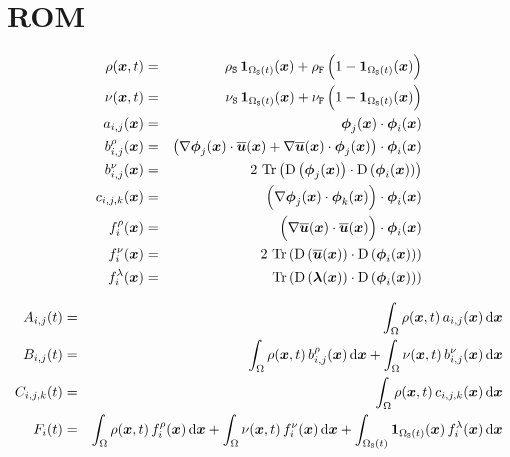 \documentclass[10pt,a4paper]{article}
\begin{document}
\section{ROM}
\begin{eqnarray}
\rho(\vx, t) &=& \rhos\,\ind{\doms(t)}(\vx)+\rhof\,\Big( 1-\ind{\doms(t)}(\vx) \Big) \\
\nu(\vx, t) &=& \nus\,\ind{\doms(t)}(\vx)+\nuf\,\Big( 1-\ind{\doms(t)}(\vx) \Big) \\
a_{i,j}(\vx) &=& \vphi_j(\vx)\cdot\vphi_i(\vx) \\
b_{i,j}^\rho(\vx) &=& \left(\grad \vphi_j(\vx)\cdot\bu(\vx) + \grad \bu(\vx) \cdot\vphi_j(\vx) \right) \cdot\vphi_i(\vx)  \\ 
b_{i,j}^\nu(\vx) &=& 2\,\trace{\D{\vphi_j(\vx)}\cdot\D{\vphi_i(\vx)}} \\
c_{i,j,k}(\vx) &=& \Big(\grad \vphi_j(\vx)\cdot\vphi_k(\vx)\Big)\cdot\vphi_i(\vx)\\
f^\rho_{i}(\vx) &=& \Big(\grad \bu(\vx)\cdot\bu(\vx)\Big)\cdot\vphi_i(\vx)\\
f^\nu_{i}(\vx)&= &  2\,\trace{\D{\bu(\vx)}\cdot\D{\vphi_i(\vx)}} \\
f^\lambda_{i}(\vx)&= & \trace{\D{\vlambda(\vx)}\cdot\D{\vphi_i(\vx)}}
\end{eqnarray}

\begin{eqnarray}
A_{i,j}(t) &=& \int_{\dom}\rho( \vx, t)\,a_{i,j}(\vx)\,\d\vx \\
B_{i,j}(t) &=& \int_{\dom}\rho( \vx, t)\,b_{i,j}^\rho(\vx) \,\d\vx +\int_{\dom} \nu( \vx, t)\,b_{i,j}^\nu(\vx) \,\d\vx \\
C_{i,j,k}(t) &=& \int_{\dom}\rho( \vx, t)\,c_{i,j,k}(\vx)\,\d\vx \\
F_{i}(t) &=& \int_{\dom}\rho( \vx, t)\,f^\rho_{i}(\vx)\,\d\vx + \int_{\dom} \nu( \vx, t)\,f^\nu_{i}(\vx) \,\d\vx + \int_{\doms(t)} \ind{\doms(t)}(\vx)\,f^\lambda_{i}(\vx) \,\d\vx
\end{eqnarray}
\end{document}
